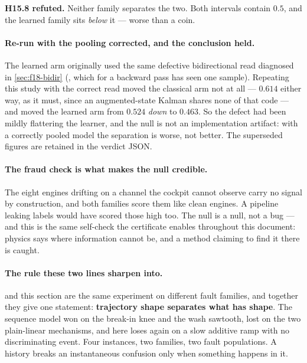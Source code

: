 \textbf{H15.8 refuted.} Neither family separates the two. Both intervals contain $0.5$, and
the learned family sits \emph{below} it --- worse than a coin.

\paragraph{Re-run with the pooling corrected, and the conclusion held.} The learned arm
originally used the same defective bidirectional read diagnosed in \cref{sec:f18-bidir}
(, which for a backward pass has seen one sample). Repeating this study with
the correct read moved the classical arm not at all --- $0.614$ either way, as it must, since an
augmented-state Kalman shares none of that code --- and moved the learned arm from $0.524$
\emph{down} to $0.463$. So the defect had been mildly flattering the learner, and the null is
not an implementation artifact: with a correctly pooled model the separation is worse, not
better. The superseded figures are retained in the verdict JSON.

\paragraph{The fraud check is what makes the null credible.} The eight engines drifting on a
channel the cockpit cannot observe carry no signal by construction, and both families score
them like clean engines. A pipeline leaking labels would have scored those high too. The null
is a null, not a bug --- and this is the same self-check the certificate enables throughout
this document: physics says where information cannot be, and a method claiming to find it there
is caught.


\paragraph{The rule these two lines sharpen into.}  and this section are the
same experiment on different fault families, and together they give one statement:
\textbf{trajectory shape separates what has shape}. The sequence model won on the break-in knee
and the wash sawtooth, lost on the two plain-linear mechanisms, and here loses again on a slow
additive ramp with no discriminating event. Four instances, two families, two fault
populations. A history breaks an instantaneous confusion only when something happens in it.

